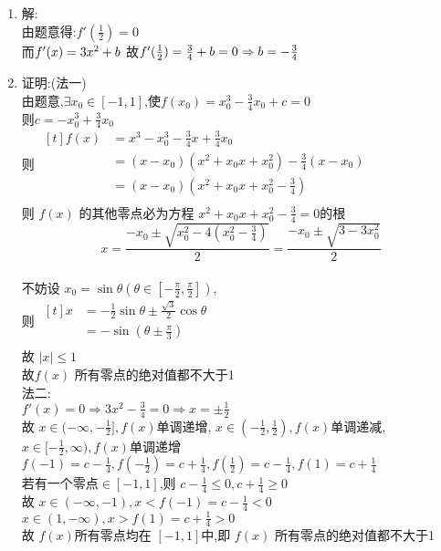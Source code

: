 \documentclass[class=ctexart,crop=false]{standalone}
\begin{document}
\begin{enumerate}[label=(\arabic*)]
    \item 解:\\
    由题意得:$f'(\frac{1}{2})=0$\\
    而$f'(x)=3x^2+b\\$
    故$f'(\frac{1}{2})=\frac{3}{4}+b=0\\
    \Rightarrow b=-\frac{3}{4}$
    \item 证明:(法一)\\
    由题意,$\exists x_0 \in [-1,1]$,使$f(x_0)=x_0^3-\frac{3}{4}x_0+c=0$\\
    则$c=-x_0^3+\frac{3}{4}x_0$\\
    则 $\begin{aligned}[t]
        f(x)&=x^3-x_0^3-\frac{3}{4}x+\frac{3}{4}x_0\\
        &=(x-x_0)(x^2+x_0x+x_0^2)-\frac{3}{4}(x-x_0)\\
        &=(x-x_0)(x^2+x_0x+x_0^2-\frac{3}{4})\\
    \end{aligned} $\\
    则 $f(x)$ 的其他零点必为方程 $x^2+x_0x+x_0^2-\frac{3}{4}=0$的根\\
    $$x=\frac{-x_0 \pm \sqrt{x_0^2-4(x_0^2-\frac{3}{4})}}{2}=\frac{-x_0\pm \sqrt{3-3x_0^2}}{2}$$\\
    不妨设 $x_0=\sin \theta(\theta \in [-\frac{\pi}{2},\frac{\pi}{2}])$,\\
    则 $\begin{aligned}[t]
        x&=-\frac{1}{2}\sin \theta \pm \frac{\sqrt{3}}{2} \cos \theta\\
        &=-\sin (\theta \pm \frac{\pi}{3})\\
    \end{aligned}$\\
    故 $|x| \leqslant1$\\
    故$f(x)$  所有零点的绝对值都不大于1\\
    法二:\\
    $f'(x)=0 \Rightarrow 3x^2-\frac{3}{4}=0 \Rightarrow x=\pm \frac{1}{2}$\\
    故 $x\in (-\infty,-\frac{1}{2}], f(x)$单调递增,
    $x\in (-\frac{1}{2},\frac{1}{2}), f(x)$单调递减,
    $x\in [-\frac{1}{2},\infty), f(x)$单调递增\\
    $f(-1)=c-\frac{1}{4},f(-\frac{1}{2})=c+\frac{1}{4},
    f(\frac{1}{2})=c-\frac{1}{4},f(1)=c+\frac{1}{4}$\\
    若有一个零点$\in [-1,1]$,则 $c-\frac{1}{4}\leqslant 0,c+\frac{1}{4}\geqslant 0$\\
    故 $x \in (-\infty,-1),x < f(-1)=c-\frac{1}{4}<0$\\
    $x \in (1,-\infty),x > f(1)=c+\frac{1}{4}>0$\\
    故 $f(x)$所有零点均在 $[-1,1]$中,即 $f(x)$  所有零点的绝对值都不大于1\\
\end{enumerate}
\end{document}
